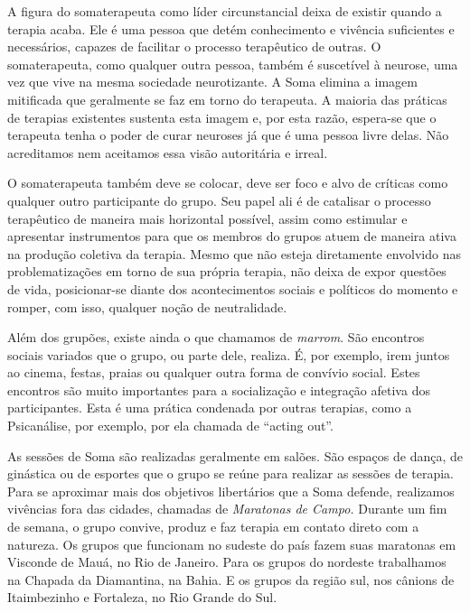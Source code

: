 A figura do somaterapeuta como líder circunstancial deixa de existir
quando a terapia acaba. Ele é uma pessoa que detém conhecimento e
vivência suficientes e necessários, capazes de facilitar o processo
terapêutico de outras. O somaterapeuta, como qualquer outra pessoa,
também é suscetível à neurose, uma vez que vive na mesma sociedade
neurotizante. A Soma elimina a imagem mitificada que geralmente se faz
em torno do terapeuta. A maioria das práticas de terapias existentes
sustenta esta imagem e, por esta razão, espera-se que o terapeuta tenha
o poder de curar neuroses já que é uma pessoa livre delas. Não
acreditamos nem aceitamos essa visão autoritária e irreal.

O somaterapeuta também deve se colocar, deve ser foco e alvo de críticas
como qualquer outro participante do grupo. Seu papel ali é de catalisar
o processo terapêutico de maneira mais horizontal possível, assim como
estimular e apresentar instrumentos para que os membros do grupos atuem
de maneira ativa na produção coletiva da terapia. Mesmo que não esteja
diretamente envolvido nas problematizações em torno de sua própria
terapia, não deixa de expor questões de vida, posicionar-se diante dos
acontecimentos sociais e políticos do momento e romper, com isso,
qualquer noção de neutralidade.

Além dos grupões, existe ainda o que chamamos de \emph{marrom}. São
encontros sociais variados que o grupo, ou parte dele, realiza. É, por
exemplo, irem juntos ao cinema, festas, praias ou qualquer outra forma
de convívio social. Estes encontros são muito importantes para a
socialização e integração afetiva dos participantes. Esta é uma prática
condenada por outras terapias, como a Psicanálise, por exemplo, por ela
chamada de ``acting out''.

As sessões de Soma são realizadas geralmente em salões. São espaços de
dança, de ginástica ou de esportes que o grupo se reúne para realizar as
sessões de terapia. Para se aproximar mais dos objetivos libertários que
a Soma defende, realizamos vivências fora das cidades, chamadas de
\emph{Maratonas de Campo.} Durante um fim de semana, o grupo convive,
produz e faz terapia em contato direto com a natureza. Os grupos que
funcionam no sudeste do país fazem suas maratonas em Visconde de Mauá,
no Rio de Janeiro. Para os grupos do nordeste trabalhamos na Chapada da
Diamantina, na Bahia. E os grupos da região sul, nos cânions de
Itaimbezinho e Fortaleza, no Rio Grande do Sul.

